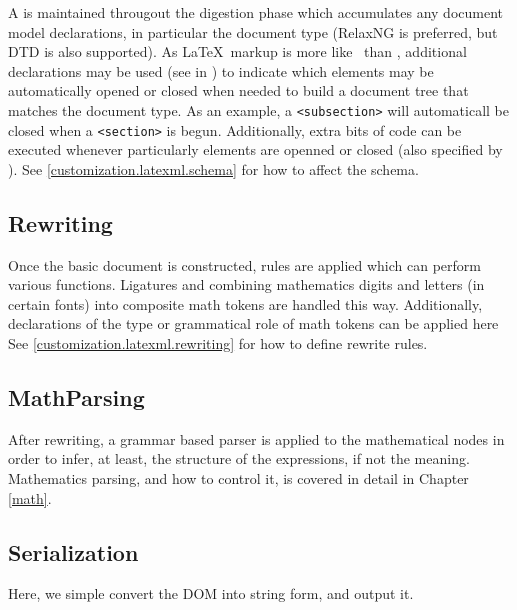 \documentclass{book}
\begin{document}
A  is maintained througout the digestion phase which accumulates
any document model declarations, in particular the document type (RelaxNG is
preferred, but DTD is also supported).  As \LaTeX\ markup is more
like \SGML\ than \XML, additional declarations may be used (see  in )
to indicate which elements may
be automatically opened or closed when needed to build a document tree that matches
the document type.  As an example, a \verb|<subsection>| will automaticall be closed
when a \verb|<section>| is begun.  Additionally, extra bits of code can
be executed whenever particularly elements are openned or closed (also
specified by ).
See \ref{customization.latexml.schema} for how to affect the schema.

\subsection{Rewriting}\label{architecture.rewriting}
%
Once the basic document is constructed,  rules are applied which can
perform various functions. Ligatures and combining mathematics digits and letters (in certain fonts)
into composite math tokens are handled this way.  Additionally, declarations
of the type or grammatical role of math tokens can be applied here
See \ref{customization.latexml.rewriting} for how to define rewrite rules.

\subsection{MathParsing}\label{architecture.mathparsing}
%
After rewriting, a grammar based parser is applied to the mathematical
nodes in order to infer, at least, the structure of the expressions,
if not the meaning.
Mathematics parsing, and how to control it, is covered in detail in Chapter \ref{math}.

\subsection{Serialization}\label{architecture.serialization}
Here, we simple convert the DOM into string form, and output it.

\end{document}
